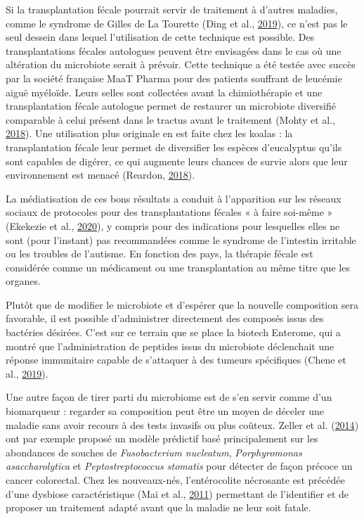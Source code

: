 \documentclass[12pt,a4paper]{reedthesis}
\theoremstyle{definition}
\theoremstyle{definition}
\theoremstyle{definition}
\theoremstyle{remark}
\begin{document}
Si la transplantation fécale pourrait servir de traitement à d'autres maladies, comme le syndrome de Gilles de La Tourette (Ding et al., \protect\hyperlink{ref-ding2019selective}{2019}), ce n'est pas le seul dessein dans lequel l'utilisation de cette technique est possible. Des transplantations fécales autologues peuvent être envisagées dans le cas où une altération du microbiote serait à prévoir. Cette technique a été testée avec succès par la société française MaaT Pharma pour des patients souffrant de leucémie aiguë myéloïde. Leurs selles sont collectées avant la chimiothérapie et une transplantation fécale autologue permet de restaurer un microbiote diversifié comparable à celui présent dans le tractus avant le traitement (Mohty et al., \protect\hyperlink{ref-mohty2018odyssee}{2018}). Une utilisation plus originale en est faite chez les koalas : la transplantation fécale leur permet de diversifier les espèces d'eucalyptus qu'ils sont capables de digérer, ce qui augmente leurs chances de survie alors que leur environnement est menacé (Reardon, \protect\hyperlink{ref-reardon2018faecal}{2018}).

La médiatisation de ces bons résultats a conduit à l'apparition sur les réseaux sociaux de protocoles pour des transplantations fécales « à faire soi-même » (Ekekezie et al., \protect\hyperlink{ref-ekekezie2020understanding}{2020}), y compris pour des indications pour lesquelles elles ne sont (pour l'instant) pas recommandées comme le syndrome de l'intestin irritable ou les troubles de l'autisme. En fonction des pays, la thérapie fécale est considérée comme un médicament ou une transplantation au même titre que les organes.

Plutôt que de modifier le microbiote et d'espérer que la nouvelle composition sera favorable, il est possible d'administrer directement des composés issus des bactéries désirées. C'est sur ce terrain que se place la biotech Enterome, qui a montré que l'administration de peptides issus du microbiote déclenchait une réponse immunitaire capable de s'attaquer à des tumeurs spécifiques (Chene et al., \protect\hyperlink{ref-chene2019microbiome}{2019}).

Une autre façon de tirer parti du microbiome est de s'en servir comme d'un biomarqueur : regarder sa composition peut être un moyen de déceler une maladie sans avoir recours à des tests invasifs ou plus coûteux.
Zeller et al. (\protect\hyperlink{ref-zeller2014potential}{2014}) ont par exemple proposé un modèle prédictif basé principalement sur les abondances de souches de \emph{Fusobacterium nucleatum}, \emph{Porphyromonas asaccharolytica} et \emph{Peptostreptococcus stomatis} pour détecter de façon précoce un cancer colorectal.
Chez les nouveaux-nés, l'entérocolite nécrosante est précédée d'une dysbiose caractéristique (Mai et al., \protect\hyperlink{ref-mai2011fecal}{2011}) permettant de l'identifier et de proposer un traitement adapté avant que la maladie ne leur soit fatale.
\end{document}
